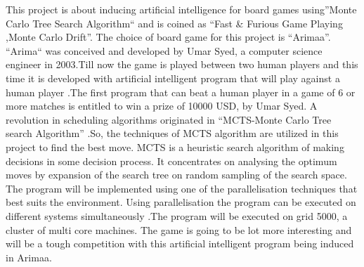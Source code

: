 
This project is about inducing artificial intelligence for board games using”Monte Carlo Tree Search Algorithm“ and is coined as “Fast \& Furious Game Playing ,Monte Carlo Drift”. The choice of board game for this project is “Arimaa”.
\newline
\newline
“Arima“ was conceived and developed by Umar Syed, a computer science engineer in 2003.Till now the game is played between two human players and this time it is developed with artificial intelligent program that will play against a human player .The first program that can beat a human player in a game of 6 or more matches is entitled to win a prize of 10000 USD, by Umar Syed.
\newline
\newline
A revolution in scheduling algorithms originated in “MCTS-Monte Carlo Tree search Algorithm” .So, the techniques of MCTS algorithm are utilized in this project to find the best move. MCTS is a heuristic search algorithm of making decisions in some decision process. It concentrates on analysing the optimum moves by expansion of the search tree on random sampling of the search space.
\newline
\newline
The program will be implemented using one of the parallelisation techniques that best suits the environment. Using parallelisation the program can be executed on different systems simultaneously .The program will be executed on grid 5000, a cluster of multi core machines.
\newline
\newline
The game is going to be lot more interesting and will be a tough competition with this artificial intelligent program being induced in Arimaa.